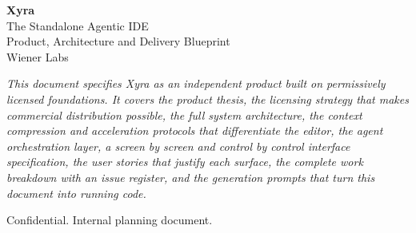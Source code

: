\documentclass[11pt,a4paper,oneside]{report}
\begin{document}
\begin{titlepage}
\centering
\vspace*{2.5cm}

{\Huge\bfseries\color{xyraink} Xyra}\\[6pt]
{\Large\color{xyralime} The Standalone Agentic IDE}\\[28pt]

{\large Product, Architecture and Delivery Blueprint}\\[10pt]
{\normalsize Wiener Labs}\\[36pt]


\vspace{30pt}
\begin{minipage}{0.82\textwidth}
\small\itshape\color{xyragrey}
This document specifies Xyra as an independent product built on permissively licensed
foundations. It covers the product thesis, the licensing strategy that makes commercial
distribution possible, the full system architecture, the context compression and
acceleration protocols that differentiate the editor, the agent orchestration layer,
a screen by screen and control by control interface specification, the user stories that
justify each surface, the complete work breakdown with an issue register, and the
generation prompts that turn this document into running code.
\end{minipage}

\vfill
{\small\color{xyragrey} Confidential. Internal planning document.}
\end{titlepage}

\tableofcontents
\clearpage












\end{document}

